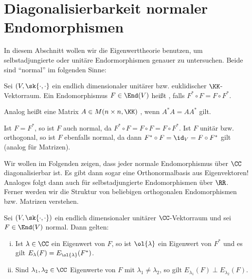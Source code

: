 \section{Diagonalisierbarkeit normaler Endomorphismen}
\label{sec:2.7}

In diesem Abschnitt wollen wir die Eigenwerttheorie benutzen, um selbstadjungierte oder unitäre Endormorphismen genauer zu untersuchen.
Beide sind \enquote{normal} im folgenden Sinne:

\begin{definition}
	\label{def:7.1}
	Sei $(V,\sk{\cdot,\cdot}$ ein endlich dimensionaler unitärer bzw. euklidischer $\KK$-Vektorraum.
	Ein Endomorphismus $F \in \End(V)$ heißt , falls $F^* \circ F = F \circ F^*$.
	
	Analog heißt eine Matrix $A \in M(n \times n,\KK)$ , wenn $A^*A = AA^*$ gilt.
\end{definition}

Ist $F = F^*$, so ist $F$ auch normal, da $F^* \circ F = F \circ F = F \circ F^*$.
Ist $F$ unitär bzw. orthogonal, so ist $F$ ebenfalls normal, da dann $F^* \circ F = \id_V = F \circ F^*$ gilt (analog für Matrizen).

Wir wollen im Folgenden zeigen, dass jeder normale Endomorphismus über $\CC$ diagonalisierbar ist.
Es gibt dann sogar eine Orthonormalbasis aus Eigenvektoren!
Analoges folgt dann auch für selbstadjungierte Endomorphismen über $\RR$.
Ferner werden wir die Struktur von beliebigen orthogonalen Endomorphismen bzw. Matrizen verstehen.

\begin{lemma}
	\label{lemma:7.2}
	Sei $(V,\sk{\cdot,\cdot})$ ein endlich dimensionaler unitärer $\CC$-Vektorraum und sei $F \in \End(V)$ normal.
	Dann gelten:
	\begin{enumerate}[(i)]
		\item Ist $\lambda \in \CC$ ein Eigenwert von $F$, so ist $\ol{\lambda}$ ein Eigenwert von $F^*$ und es gilt $E_\lambda(F) = E_{\ol{\lambda}}(F^*)$.
		\item Sind $\lambda_1,\lambda_2 \in \CC$ Eigenwerte von $F$ mit $\lambda_1 \neq \lambda_2$, so gilt $E_{\lambda_1}(F) \perp E_{\lambda_2}(F)$.
	\end{enumerate}
\end{lemma}

